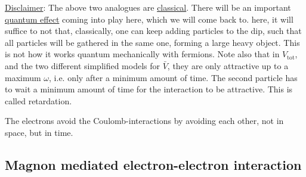 \underline{Disclaimer}: The above two analogues are \underline{classical}. There will be an important \underline{quantum effect} coming into play here, which we will come back to. here, it will suffice to not that, classically, one can keep adding particles to the dip, such that all particles will be gathered in the same one, forming a large heavy object. This is not how it works quantum mechanically with fermions. Note also that in $V_{\text{tot}}$, and the two different simplified models for $\bar V$, they are only attractive up to a maximum $\omega$, i.e. only after a minimum amount of time. The second particle has to wait a minimum amount of time for the interaction to be attractive. This is called retardation. 
\begin{tcolorbox}
	The electrons avoid the Coulomb-interactions by avoiding each other, not in space, but in time. 
\end{tcolorbox}


\subsection[Magnons]{Magnon mediated electron-electron interaction}

